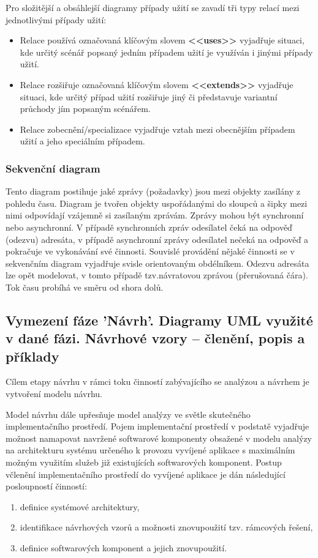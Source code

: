 Pro složitější a obsáhlejší diagramy případy užití se zavadí tři typy relací mezi jednotlivými případy užití: 
\begin{itemize}
\item Relace používá označovaná klíčovým slovem \textbf{<<uses>>} vyjadřuje situaci, kde určitý scénář popsaný jedním případem užití je využíván i jinými případy užití.
\item Relace rozšiřuje označovaná klíčovým slovem \textbf{<<extends>>} vyjadřuje  situaci, kde určitý případ užití rozšiřuje jiný či představuje variantní průchody jím popsaným scénářem. 
\item Relace zobecnění/specializace vyjadřuje vztah mezi obecnějším případem užití a jeho speciálním případem.
\end{itemize}



\subsubsection{Sekvenční diagram}
Tento diagram postihuje jaké zprávy (požadavky) jsou mezi objekty zasílány z pohledu času. Diagram je tvořen objekty uspořádanými do sloupců a šipky mezi nimi odpovídají vzájemně si zasílaným zprávám. Zprávy mohou být synchronní nebo asynchronní. 
V případě synchronních zpráv odesílatel čeká na odpověď (odezvu) adresáta, v případě asynchronní zprávy odesílatel nečeká na odpověď a pokračuje ve vykonávání své činnosti. Souvislé provádění nějaké činnosti se v sekvenčním diagram vyjadřuje svisle orientovaným obdélníkem. Odezvu adresáta lze opět modelovat, v tomto případě tzv.návratovou zprávou (přerušovaná čára). Tok času probíhá ve směru od shora dolů.

\subsection[Návrh, UML diagramy, návrhové vzory]{Vymezení fáze 'Návrh'. Diagramy UML využité v dané fázi. Návrhové vzory – členění, popis a příklady}
Cílem etapy návrhu v rámci toku činností zabývajícího se analýzou a návrhem je vytvoření modelu návrhu.

Model návrhu dále upřesňuje model analýzy ve světle skutečného implementačního prostředí. Pojem implementační prostředí v podstatě vyjadřuje možnost namapovat navržené softwarové komponenty obsažené v modelu analýzy na architekturu systému určeného k provozu vyvíjené aplikace s maximálním možným využitím služeb již existujících softwarových komponent. Postup včlenění implementačního prostředí do vyvíjené aplikace je dán následující posloupností činností:
\begin{enumerate}
\item definice systémové architektury,
\item identifikace návrhových vzorů a možnosti znovupoužití tzv. rámcových řešení,
\item definice softwarových komponent a jejich znovupoužití.
\end{enumerate}

